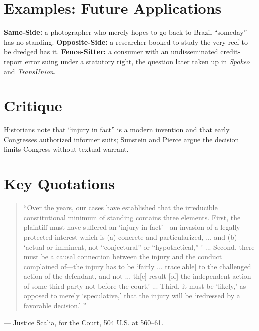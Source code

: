 \documentclass[12pt]{article}
\begin{document}
\section{Examples: Future Applications}
\textbf{Same-Side:} a photographer who merely hopes to go back to Brazil ``someday'' has no standing. \textbf{Opposite-Side:} a researcher booked to study the very reef to be dredged has it. \textbf{Fence-Sitter:} a consumer with an undisseminated credit-report error suing under a statutory right, the question later taken up in \textit{Spokeo} and \textit{TransUnion}.

\section{Critique}
Historians note that ``injury in fact'' is a modern invention and that early Congresses authorized informer suits; Sunstein and Pierce argue the decision limits Congress without textual warrant.

\section{Key Quotations}
\begin{quote}
``Over the years, our cases have established that the irreducible constitutional minimum of standing contains three elements. First, the plaintiff must have suffered an `injury in fact'---an invasion of a legally protected interest which is (a) concrete and particularized, ... and (b) `actual or imminent, not ``conjectural'' or ``hypothetical,'' ' ... Second, there must be a causal connection between the injury and the conduct complained of---the injury has to be `fairly ... trace[able] to the challenged action of the defendant, and not ... th[e] result [of] the independent action of some third party not before the court.' ... Third, it must be `likely,' as opposed to merely `speculative,' that the injury will be `redressed by a favorable decision.' ''
\end{quote}
\noindent --- Justice Scalia, for the Court, 504 U.S. at 560--61.
\end{document}

